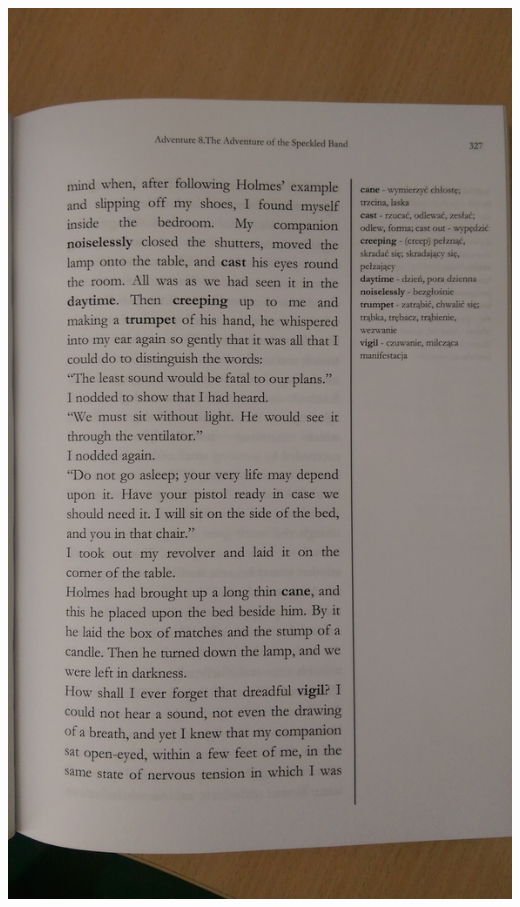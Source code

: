 \documentclass[a4paper,landscape,headrule,footrule,xetex]{foils}
\begin{document}
\includegraphics[trim={0 48cm 0 16cm},clip,width=\textwidth]{pics/IMAG0172}



\end{document}
